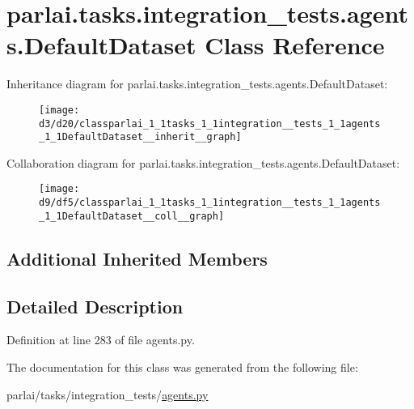 \hypertarget{classparlai_1_1tasks_1_1integration__tests_1_1agents_1_1DefaultDataset}{}\section{parlai.\+tasks.\+integration\+\_\+tests.\+agents.\+Default\+Dataset Class Reference}
\label{classparlai_1_1tasks_1_1integration__tests_1_1agents_1_1DefaultDataset}


Inheritance diagram for parlai.\+tasks.\+integration\+\_\+tests.\+agents.\+Default\+Dataset\+:\nopagebreak
\begin{figure}[H]
\begin{center}
\leavevmode
\texttt{[image: d3/d20/classparlai\_1\_1tasks\_1\_1integration\_\_tests\_1\_1agents\_1\_1DefaultDataset\_\_inherit\_\_graph]}
\end{center}
\end{figure}


Collaboration diagram for parlai.\+tasks.\+integration\+\_\+tests.\+agents.\+Default\+Dataset\+:\nopagebreak
\begin{figure}[H]
\begin{center}
\leavevmode
\texttt{[image: d9/df5/classparlai\_1\_1tasks\_1\_1integration\_\_tests\_1\_1agents\_1\_1DefaultDataset\_\_coll\_\_graph]}
\end{center}
\end{figure}
\subsection*{Additional Inherited Members}


\subsection{Detailed Description}


Definition at line 283 of file agents.\+py.



The documentation for this class was generated from the following file\+:\begin{DoxyCompactItemize}
\item 
parlai/tasks/integration\+\_\+tests/\hyperlink{parlai_2tasks_2integration__tests_2agents_8py}{agents.\+py}\end{DoxyCompactItemize}
